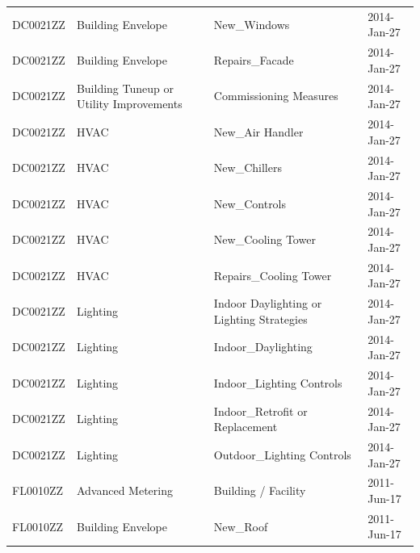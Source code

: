 \documentclass[12pt]{article}
\begin{document}
\begin{longtable}{lp{4cm}p{4cm}p{3cm}}
DC0021ZZ         & Building Envelope                       & New\_Windows                              & 2014-Jan-27                   \\
DC0021ZZ         & Building Envelope                       & Repairs\_Facade                           & 2014-Jan-27                   \\
DC0021ZZ         & Building Tuneup or Utility Improvements & Commissioning Measures                    & 2014-Jan-27                   \\
DC0021ZZ         & HVAC                                    & New\_Air Handler                          & 2014-Jan-27                   \\
DC0021ZZ         & HVAC                                    & New\_Chillers                             & 2014-Jan-27                   \\
DC0021ZZ         & HVAC                                    & New\_Controls                             & 2014-Jan-27                   \\
DC0021ZZ         & HVAC                                    & New\_Cooling Tower                        & 2014-Jan-27                   \\
DC0021ZZ         & HVAC                                    & Repairs\_Cooling Tower                    & 2014-Jan-27                   \\
DC0021ZZ         & Lighting                                & Indoor Daylighting or Lighting Strategies & 2014-Jan-27                   \\
DC0021ZZ         & Lighting                                & Indoor\_Daylighting                       & 2014-Jan-27                   \\
DC0021ZZ         & Lighting                                & Indoor\_Lighting Controls                 & 2014-Jan-27                   \\
DC0021ZZ         & Lighting                                & Indoor\_Retrofit or Replacement           & 2014-Jan-27                   \\
DC0021ZZ         & Lighting                                & Outdoor\_Lighting Controls                & 2014-Jan-27                   \\
FL0010ZZ         & Advanced Metering                       & Building / Facility                       & 2011-Jun-17                   \\
FL0010ZZ         & Building Envelope                       & New\_Roof                                 & 2011-Jun-17                   \\

\end{longtable}
\end{document}
